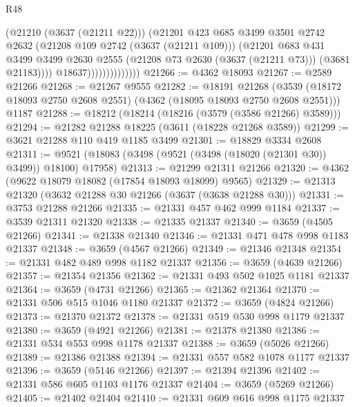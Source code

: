 \begin{lexlean}{R48}
\begin{coremodule}
                                  (@21210 (@3637 (@21211 @22)))
                                  (@21201
                                    @423
                                    @685
                                    @3499
                                    @3501
                                    @2742
                                    @2632
                                    (@21208 @109 @2742 (@3637 (@21211 @109)))
                                    (@21201
                                      @683
                                      @431
                                      @3499
                                      @3499
                                      @2630
                                      @2555
                                      (@21208 @73 @2630 (@3637 (@21211 @73)))
                                      (@3681 @21183))))
                                @18637))))))))))))))
@21266 := @4362 @18093
@21267 := @2589 @21266
@21268 := @21267 @9555
@21282 := @18191
    @21268
    (@3539 (@18172 @18093 @2750 @2608 @2551) (@4362 (@18095 @18093 @2750 @2608 @2551)))
    @1187
@21288 := @18212 (@18214 (@18216 (@3579 (@3586 @21266) @3589)))
@21294 := @21282 @21288 @18225 (@3611 (@18228 @21268 @3589))
@21299 := @3621 @21288 @110 @419 @1185 @3499
@21301 := @18829 @3334 @2608
@21311 := @9521 (@18083 (@3498 (@9521 (@3498 (@18020 (@21301 @30)) @3499)) @18100) @17958)
@21313 := @21299 @21311 @21266
@21320 := @4362 (@9622 @18079 @18082 (@17854 @18093 @18099) @9565)
@21329 := @21313 @21320 (@3632 @21288 @30 @21266 (@3637 (@3638 @21288 @30)))
@21331 := @3753 @21288 @21266
@21335 := @21331 @457 @462 @999 @1184
@21337 := @3539 @21311 @21320
@21338 := @21335 @21337
@21340 := @3659 (@4505 @21266)
@21341 := @21338 @21340
@21346 := @21331 @471 @478 @998 @1183 @21337
@21348 := @3659 (@4567 @21266)
@21349 := @21346 @21348
@21354 := @21331 @482 @489 @998 @1182 @21337
@21356 := @3659 (@4639 @21266)
@21357 := @21354 @21356
@21362 := @21331 @493 @502 @1025 @1181 @21337
@21364 := @3659 (@4731 @21266)
@21365 := @21362 @21364
@21370 := @21331 @506 @515 @1046 @1180 @21337
@21372 := @3659 (@4824 @21266)
@21373 := @21370 @21372
@21378 := @21331 @519 @530 @998 @1179 @21337
@21380 := @3659 (@4921 @21266)
@21381 := @21378 @21380
@21386 := @21331 @534 @553 @998 @1178 @21337
@21388 := @3659 (@5026 @21266)
@21389 := @21386 @21388
@21394 := @21331 @557 @582 @1078 @1177 @21337
@21396 := @3659 (@5146 @21266)
@21397 := @21394 @21396
@21402 := @21331 @586 @605 @1103 @1176 @21337
@21404 := @3659 (@5269 @21266)
@21405 := @21402 @21404
@21410 := @21331 @609 @616 @998 @1175 @21337

\end{coremodule}
\end{lexlean}
